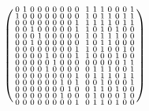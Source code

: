\begin{example}
{\begin{equation*}
\begin{psmallmatrix}
            0 & 1 & 0 & 0 & 0 & 0 & 0 & 0 & 0 & & 1 & 1 & 1 & 0 & 0 & 0 & 1 \\
            1 & 0 & 0 & 0 & 0 & 0 & 0 & 0 & 0 & & 1 & 0 & 1 & 1 & 0 & 1 & 1 \\
            0 & 0 & 0 & 0 & 0 & 0 & 0 & 0 & 1 & & 1 & 1 & 1 & 1 & 0 & 1 & 1 \\
            0 & 0 & 1 & 0 & 0 & 0 & 0 & 0 & 1 & & 1 & 0 & 1 & 0 & 1 & 0 & 0 \\
            0 & 0 & 0 & 1 & 0 & 0 & 0 & 0 & 0 & & 1 & 0 & 1 & 1 & 1 & 0 & 0 \\
            0 & 0 & 1 & 0 & 0 & 0 & 0 & 0 & 0 & & 1 & 0 & 1 & 1 & 0 & 0 & 0 \\
            0 & 0 & 0 & 0 & 0 & 0 & 0 & 0 & 1 & & 1 & 0 & 1 & 0 & 0 & 1 & 0 \\
            0 & 0 & 0 & 0 & 1 & 0 & 0 & 0 & 1 & & 1 & 0 & 0 & 0 & 1 & 0 & 0 \\
            0 & 0 & 0 & 0 & 0 & 1 & 0 & 0 & 0 & & 0 & 0 & 0 & 0 & 0 & 1 & 1 \\
            0 & 0 & 0 & 0 & 1 & 0 & 0 & 0 & 0 & & 0 & 1 & 1 & 1 & 0 & 0 & 1 \\
            0 & 0 & 0 & 0 & 0 & 0 & 0 & 0 & 1 & & 0 & 1 & 1 & 1 & 0 & 1 & 1 \\
            0 & 0 & 0 & 0 & 0 & 0 & 1 & 0 & 1 & & 0 & 0 & 1 & 0 & 0 & 0 & 1 \\
            0 & 0 & 0 & 0 & 0 & 0 & 0 & 1 & 0 & & 0 & 1 & 1 & 0 & 1 & 0 & 0 \\
            0 & 0 & 0 & 0 & 0 & 0 & 1 & 0 & 0 & & 0 & 1 & 0 & 0 & 0 & 1 & 0 \\
            0 & 0 & 0 & 0 & 0 & 0 & 0 & 0 & 1 & & 0 & 1 & 1 & 0 & 1 & 0 & 0 \\
        \end{psmallmatrix}
    \end{equation*}
}


\end{example}
